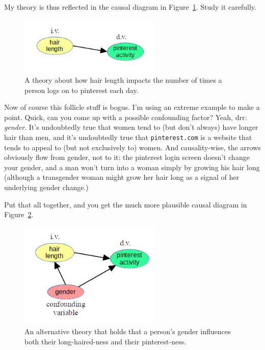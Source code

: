 My theory is thus reflected in the causal diagram in
Figure~\ref{fig:hairPinterest}. Study it carefully.

\begin{figure}[ht]
\centering
\includegraphics[width=0.6\textwidth]{hairPinterest.png}
\caption{A theory about how hair length impacts the number of times a person
logs on to pinterest each day.}
\label{fig:hairPinterest}
\end{figure}

Now of course this follicle stuff is bogus. I'm using an extreme example to
make a point. Quick, can you come up with a possible confounding factor? Yeah,
drr: \textit{gender}. It's undoubtedly true that women tend to (but don't
always) have longer hair than men, and it's undoubtedly true that
\texttt{pinterest.com} is a website that tends to appeal to (but not
exclusively to) women. And causality-wise, the arrows obviously flow from
gender, not to it: the pinterest login screen doesn't change your gender, and a
man won't turn into a woman simply by growing his hair long (although a
transgender woman might grow her hair long as a signal of her underlying gender
change.) 

Put that all together, and you get the much more plausible causal diagram in
Figure~\ref{fig:hairPinterest2}.

\begin{figure}[ht]
\centering
\includegraphics[width=0.6\textwidth]{hairPinterest2.png}
\caption{An alternative theory that holds that a person's gender influences
both their long-haired-ness and their pinterest-ness.}
\label{fig:hairPinterest2}
\end{figure}


